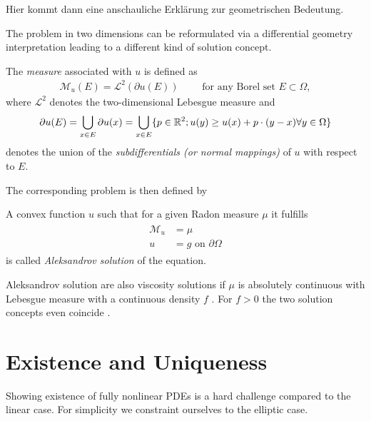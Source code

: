 Hier kommt dann eine anschauliche Erklärung zur geometrischen Bedeutung.

The \MA problem in two dimensions can be reformulated via a differential geometry interpretation leading to a different kind of solution concept.

\begin{definition}\label{def:MA measure}
	The \emph{\MA measure} associated with $u$ is defined as 
	\begin{align}
		\mathcal{M}_u (E) = \mathcal{L}^2(\partial u(E)) \qquad \text{ for any Borel set } E \subset \Omega,
	\end{align}
	where $\mathcal{L}^2$ denotes the two-dimensional Lebesgue measure and 
	\[
		\partial u(E) = \bigcup_{x \in E} \partial u (x) = \bigcup_{x \in E} \{p \in \mathbb{R}^2; u(y) \geq u(x) +p\cdot (y-x) \forall y \in \Omega\}
	\]
	denotes the union of the \emph{subdifferentials (or normal mappings)} of $u$ with respect to $E$.
\end{definition}
The corresponding \MA problem is then defined by


\begin{definition}\label{def:aleksandrov solution}
A convex function $u$ such that for a given Radon measure $\mu$ it fulfills
\begin{align}
\begin{split}
\mathcal M_u&= \mu \\ 
u &= g  \text{ on } \partial \Omega
\end{split}
\end{align}
is called \emph{Aleksandrov solution} of the \MA equation.
\end{definition}

Aleksandrov solution are also viscosity solutions if $\mu$ is absolutely continuous with Lebesgue measure with a continuous density $f$ \cite{G2001} . For $f > 0$ the two solution concepts even coincide \cite{G2001}. 

\section{Existence and Uniqueness}
Showing existence of fully nonlinear PDEs is a hard challenge compared to the linear case. For simplicity we constraint ourselves to the elliptic case. 


